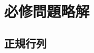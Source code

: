 \documentclass[12pt,twoside]{jarticle}
\newcommand\commentout[1]{#1}
\newcommand\commentout[1]{}
\begin{document}
%
%







\section{必修問題略解}


\subsection{正規行列}
\end{document}
